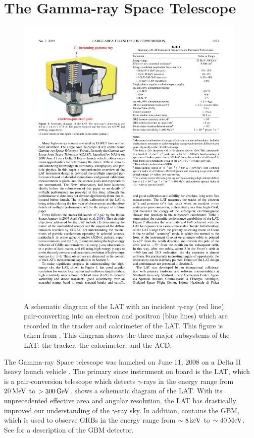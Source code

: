 \section{The \fermi Gamma-ray Space Telescope}

\begin{figure}[htbp]
  \centering
    \includegraphics{chapters/introduction/figures/lat_detector_cutout.pdf}
  \caption{A schematic diagram of the \ac{LAT} with an incident $\gamma$-ray
    (red line) pair-converting into an electron and positron (blue lines)
    which are recorded in the tracker and calorimeter of the \ac{LAT}.
    This figure is taken from \citep{atwood_2009a_large-telescope}.  
    This diagram shows the three major subsystems of the \ac{LAT}:
    the tracker, the calorimeter, and the \ac{ACD}.
  }
\end{figure} 


The \fermi Gamma-ray Space telescope was launched on June 11, 2008 on
a Delta II heavy launch vehicle \citep{atwood_2009a_large-telescope}.
The primary since instrument on board \fermi is the \ac{LAT},
which is a pair-conversion telescope which detects $\gamma$-rays
in the energy range from $20\,\text{MeV}$ to $>300\,\text{GeV}$.
 shows a schematic diagram of the \ac{LAT}.
With its unprecedented effective area and angular resolution, the \ac{LAT}
has drastically improved our understanding of the $\gamma$-ray sky.
In addition, \fermi contains the \Ac{GBM}, which is used to observe
\acp{GRB} in the energy range from $\sim8\,\text{keV}$ to $\sim40\,\text{MeV}$.
See \cite{meegan_2009a_fermi-gamma-ray} for a description of the \ac{GBM}
detector.

